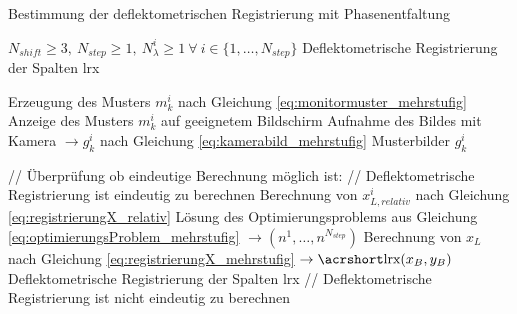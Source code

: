 \begin{algorithm}[H]
\caption{Bestimmung der deflektometrischen Registrierung mit Phasenentfaltung}
	\label{alg:bestimmungDeflektometrischeRegistrierung}
	\begin{algorithmic}[1]
		\Require $N_{shift} \geq 3, ~N_{step} \geq 1, ~N_\lambda^i \geq 1 ~\forall ~i \in \lbrace 1,\ldots,N_{step} \rbrace$
		\Ensure Deflektometrische Registrierung der Spalten \acrshort{lrx}
		
		\Statex		
		
					\State Erzeugung des Musters $m_k^i$ nach Gleichung \ref{eq:monitormuster_mehrstufig}
					\State Anzeige des Musters $m_k^i$ auf geeignetem Bildschirm
					\State Aufnahme des Bildes mit Kamera $\rightarrow g_k^i$ nach Gleichung \ref{eq:kamerabild_mehrstufig}
				\EndFor
			\EndFor
			\State \Return Musterbilder $g_k^i$
		\EndProcedure
		
		\Statex
		
			\State // Überprüfung ob eindeutige Berechnung möglich ist:
				\State // Deflektometrische Registrierung ist eindeutig zu berechnen
						\State Berechnung von $x_{L,relativ}^i$ nach Gleichung \ref{eq:registrierungX_relativ}
					\EndFor
					\State Lösung des Optimierungsproblems aus Gleichung \ref{eq:optimierungsProblem_mehrstufig} $\rightarrow (n^1,\ldots, n^{N_{step}})$
					\State Berechnung von $x_L$ nach Gleichung \ref{eq:registrierungX_mehrstufig} $\rightarrow \acrshortmath{lrx}(x_B, y_B)$
				\EndFor
				\State \Return Deflektometrische Registrierung der Spalten \acrshort{lrx}
			\Else
				\State // Deflektometrische Registrierung ist nicht eindeutig zu berechnen
				\State \Return
			\EndIf
		\EndProcedure
	\end{algorithmic}
\end{algorithm}